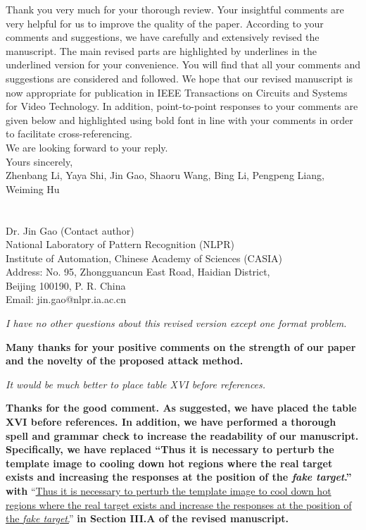 \documentclass[12pt]{article}
\begin{document}
Thank you very much for your thorough review. Your insightful comments are very helpful for us to improve the quality of the paper. According to your comments and suggestions, we have carefully and extensively revised the manuscript. The main revised parts are highlighted by underlines in the underlined version for your convenience. You will find that all your comments and suggestions are considered and followed. We hope that our revised manuscript is now appropriate for publication in IEEE Transactions on Circuits and Systems for Video Technology.
In addition, point-to-point responses to your comments are given below and highlighted using bold font in line with your comments in order to facilitate cross-referencing.\\[10pt]
\indent We are looking forward to your reply.\\[10pt]
\noindent Yours sincerely,\\
\noindent Zhenbang Li, Yaya Shi, Jin Gao, Shaoru Wang, Bing Li, Pengpeng Liang, Weiming Hu
\\
\\
\\
\noindent Dr. Jin Gao (Contact author)\\
\noindent National Laboratory of Pattern Recognition (NLPR)\\
\noindent Institute of Automation, Chinese Academy of Sciences (CASIA)\\
\noindent Address: No. 95, Zhongguancun East Road, Haidian District,\\
\noindent Beijing 100190, P. R. China\\
\noindent Email: jin.gao@nlpr.ia.ac.cn

\newpage

\textit{I have no other questions about this revised version except one format problem.}

\textbf{Many thanks for your positive comments on the strength of our paper and the novelty of the proposed attack method.}

\textit{It would be much better to place table XVI before references.}

\textbf{Thanks for the good comment. As suggested, we have placed the table XVI before references. In addition, we have performed a thorough spell and grammar check to increase the readability of our manuscript. Specifically, we have replaced ``Thus it is necessary to perturb the template image to cooling down hot regions where the real target exists and increasing the responses at the position of the \textit{fake target}.'' with} ``\uline{Thus it is necessary to perturb the template image to cool down hot regions where the real target exists and increase the responses at the position of the \textit{fake target}.}''
\textbf{in Section III.A of the revised manuscript.}
\end{document}
